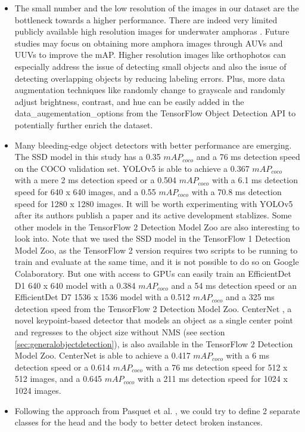 \documentclass[a4paper, 11pt, oneside]{article}
\begin{document}
  \begin{itemize}
    \item The small number and the low resolution of the images in our dataset are the bottleneck towards a higher
    performance. There are indeed very limited publicly available high resolution images for underwater amphoras
    \cite{pasquet2017amphora}. Future studies may focus on obtaining more amphora images through AUVs and UUVs to improve
    the mAP. Higher resolution images like orthophotos can especially address the issue of detecting
    small objects \cite{kisantal2019augmentation} and also the issue of detecting overlapping objects by reducing labeling
    errors. Plus, more data augmentation techniques like randomly change to grayscale and randomly adjust brightness,
    contrast, and hue can be easily added in the data\_augementation\_options from the TensorFlow Object Detection API
    to potentially further enrich the dataset.
    \item Many bleeding-edge object detectors with better performance are emerging. The SSD model in this study
    has a 0.35 $mAP_{coco}$ and a 76 ms detection speed on the COCO validation set. YOLOv5 is able to achieve a 0.367
    $mAP_{coco}$ with a mere 2 ms detection speed or a 0.504 $mAP_{coco}$ with a 6.1 ms detection speed for 640 x 640 images,
    and a 0.55 $mAP_{coco}$ with a 70.8 ms detection speed for 1280 x 1280 images. It will be worth experimenting with
    YOLOv5 after its authors publish a paper and its active development stablizes. Some other models in the TensorFlow 2
    Detection Model Zoo \cite{tf2detectionmodelzoo} are also interesting to look into. Note that we used the SSD
    model in the TensorFlow 1 Detection Model Zoo, as the TensorFlow 2 version requires two scripts to be running
    to train and evaluate at the same time, and it is not possible to do so on Google Colaboratory. But one with access to
    GPUs can easily train an EfficientDet \cite{tan2020efficientdet} D1 640 x 640 model with a 0.384 $mAP_{coco}$ and a
    54 ms detection speed or an EfficientDet D7 1536 x 1536 model with a 0.512 $mAP_{coco}$ and a 325 ms detection speed
    from the TensorFlow 2 Detection Model Zoo. CenterNet \cite{zhou2019objects}, a novel keypoint-based detector that
    models an object as a single center point and regresses to the object size without NMS
    (see section \ref{sec:generalobjectdetection}), is also available in the TensorFlow 2 Detection Model Zoo. CenterNet
    is able to achieve a 0.417 $mAP_{coco}$ with a 6 ms detection speed or a 0.614 $mAP_{coco}$ with a 76 ms detection
    speed for 512 x 512 images, and a 0.645 $mAP_{coco}$ with a 211 ms detection speed for 1024 x 1024 images.
    \item Following the approach from Pasquet et al. \cite{pasquet2017amphora}, we could try to define 2 separate classes
    for the head and the body to better detect broken instances.
  \end{itemize}

  \newpage

  \printbibliography
\end{document}
